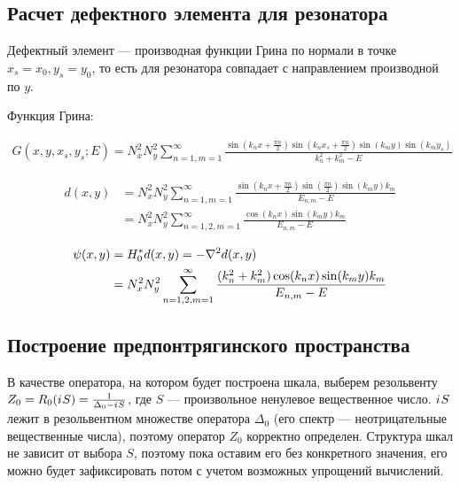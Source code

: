 

\subsection{Расчет дефектного элемента для резонатора}
Дефектный элемент — производная функции Грина по нормали в точке $x_s = x_0, y_s = y_0$, то есть для резонатора совпадает с направлением производной по $y$.

Функция Грина:

\begin{align*}
G(x, y, x_s, y_s; E) = N_x^2 N_y^2 \sum\limits_{n = 1, m = 1}^\infty \frac{\sin(k_n x + \frac{\pi n}{2}) \sin(k_n x_s  + \frac{\pi n}{2}) \sin(k_m y) \sin(k_m y_s)}{k_n^2 + k_m^2 - E}
\end{align*}

\begin{align*}
d(x, y)
&= N_x^2 N_y^2 \sum\limits_{n = 1, m = 1}^\infty \frac{\sin(k_n x + \frac{\pi n}{2}) \sin(\frac{\pi n}{2}) \sin(k_m y) k_m}{E_{n, m} - E} \\
& = N_x^2 N_y^2 \sum\limits_{n = 1,2, m = 1}^\infty \frac{\cos(k_n x) \sin(k_m y) k_m}{E_{n, m} - E}
\end{align*}

\begin{align*}
\psi(x, y)
& = H_0^* d(x, y) = - \laplacian d(x, y) \\
& = N_x^2 N_y^2 \sum\limits_{n = 1,2, m = 1}^\infty \frac{(k_n^2 + k_m^2) \cos(k_n x) \sin(k_m y) k_m}{E_{n, m} - E}
\end{align*}

\subsection{Построение предпонтрягинского пространства}
В качестве оператора, на котором будет построена шкала, выберем резольвенту $Z_0 = R_0({i\mkern1mu} S) = \frac{1}{\Delta_0 - {i\mkern1mu} S}$, где $S$ — произвольное ненулевое вещественное число. ${i\mkern1mu} S$ лежит в резольвентном множестве оператора $\Delta_0$ (его спектр — неотрицательные вещественные числа), поэтому оператор $Z_0$ корректно определен. Структура шкал не зависит от выбора $S$, поэтому пока оставим его без конкретного значения, его можно будет зафиксировать потом с учетом возможных упрощений вычислений.

